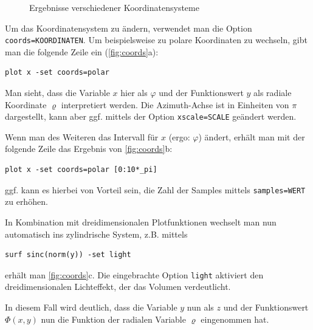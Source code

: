 \documentclass[DIV=14,headsepline,footsepline]{scrbook}
\begin{document}
\begin{figure}[htb]
					\caption{Ergebnisse verschiedener Koordinatensysteme}
					\label{fig:coords}
				\end{figure}
				
				Um das Koordinatensystem zu ändern, verwendet man die Option \lstinline+coords=KOORDINATEN+. Um beispielsweise zu polare Koordinaten zu wechseln, gibt man die folgende Zeile ein (\autoref{fig:coords}a):
				\begin{lstlisting}
plot x -set coords=polar
				\end{lstlisting}
				
				Man sieht, dass die Variable $x$ hier als $\varphi$ und der Funktionswert $y$ als radiale Koordinate $\varrho$ interpretiert werden. Die Azimuth-Achse ist in Einheiten von $\pi$ dargestellt, kann aber ggf. mittels der Option \lstinline+xscale=SCALE+ geändert werden.
				
				Wenn man des Weiteren das Intervall für $x$ (ergo: $\varphi$) ändert, erhält man mit der folgende Zeile das Ergebnis von \autoref{fig:coords}b:
				\begin{lstlisting}
plot x -set coords=polar [0:10*_pi]
				\end{lstlisting}
				ggf. kann es hierbei von Vorteil sein, die Zahl der Samples mittels \lstinline+samples=WERT+ zu erhöhen.
				
				In Kombination mit dreidimensionalen Plotfunktionen wechselt man nun automatisch ins zylindrische System, z.B. mittels 
				\begin{lstlisting}
surf sinc(norm(y)) -set light
				\end{lstlisting}
				erhält man \autoref{fig:coords}c. Die eingebrachte Option \lstinline+light+ aktiviert den dreidimensionalen Lichteffekt, der das Volumen verdeutlicht.
				
				In diesem Fall wird deutlich, dass die Variable $y$ nun als $z$ und der Funktionswert $\Phi(x,y)$ nun die Funktion der radialen Variable $\varrho$ eingenommen hat.
				
\end{document}
